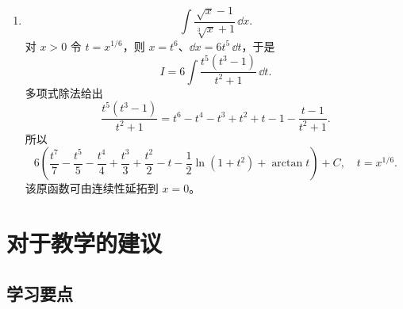 \begin{xsolution}
\begin{enumerate}[label=(\arabic*)]
    \item
    \[
      \int\frac{\sqrt{x}-1}{\sqrt[3]{x}+1}\,\dd x.
    \]
    对 $x>0$ 令 $t=x^{1/6}$，则 $x=t^6$、$\dd x=6t^5\,\dd t$，于是
    \[
      I=6\int\frac{t^5(t^3-1)}{t^2+1}\,\dd t.
    \]
    多项式除法给出
    \[
      \frac{t^5(t^3-1)}{t^2+1}
      =t^6-t^4-t^3+t^2+t-1-\frac{t-1}{t^2+1}.
    \]
    所以
    \[
      \boxed{
      6\left(
        \frac{t^7}{7}-\frac{t^5}{5}-\frac{t^4}{4}
        +\frac{t^3}{3}+\frac{t^2}{2}-t
        -\frac12\ln(1+t^2)+\arctan t
      \right)+C,
      \quad t=x^{1/6}}.
    \]
    该原函数可由连续性延拓到 $x=0$。
  \end{enumerate}
\end{xsolution}


\section{对于教学的建议}

\subsection{学习要点}


